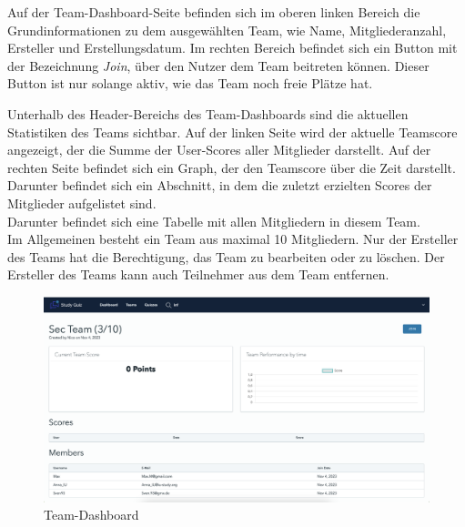 \noindent Auf der Team-Dashboard-Seite befinden sich im oberen linken Bereich die Grundinformationen zu dem 
ausgewählten Team, wie Name, Mitgliederanzahl, Ersteller und Erstellungsdatum. Im rechten Bereich befindet 
sich ein Button mit der Bezeichnung \textit{Join}, über den Nutzer dem Team beitreten können. 
Dieser Button ist nur solange aktiv, wie das Team noch freie Plätze hat.


\noindent Unterhalb des Header-Bereichs des Team-Dashboards sind die aktuellen Statistiken des Teams sichtbar. 
Auf der linken Seite wird der aktuelle Teamscore angezeigt, der die Summe der User-Scores aller 
Mitglieder darstellt. Auf der rechten Seite befindet sich ein Graph, der den Teamscore über die Zeit 
darstellt. \\

\noindent Darunter befindet sich ein Abschnitt, in dem die zuletzt erzielten Scores der Mitglieder aufgelistet sind. \\

\noindent Darunter befindet sich eine Tabelle mit allen Mitgliedern in diesem Team. \\

\noindent Im Allgemeinen besteht ein Team aus maximal 10 Mitgliedern. Nur der Ersteller des Teams hat die 
Berechtigung, das Team zu bearbeiten oder zu löschen. Der Ersteller des Teams kann auch Teilnehmer 
aus dem Team entfernen.

\begin{figure}[H]
  \includegraphics[width=\linewidth]{img/team-detail.png}
  \caption{Team-Dashboard}
  \label{fig:team}
\end{figure}

